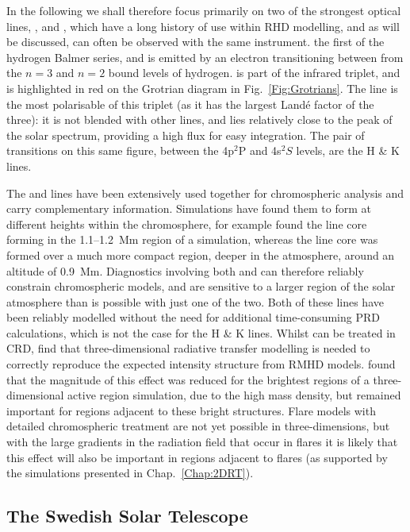 In the following we shall therefore focus primarily on two of the strongest optical lines, \Ha{}, and \CaLine{}, which have a long history of use within RHD modelling, and as will be discussed, can often be observed with the same instrument.
\Ha{} the first of the hydrogen Balmer series, and is emitted by an electron transitioning between from the $n=3$ and $n=2$ bound levels of hydrogen.
\CaLine{} is part of the \Caii{} infrared triplet, and is highlighted in red on the Grotrian diagram in Fig.~\ref{Fig:Grotrians}.
The \CaLine{} line is the most polarisable of this triplet (as it has the largest Landé factor of the three): it is not blended with other lines, and lies relatively close to the peak of the solar spectrum, providing a high flux for easy integration.
The pair of transitions on this same figure, between the 4p$^2$P and 4s$^2S$ levels, are the \Caii{} H \& K lines.

The \Ha{} and \CaLine{} lines have been extensively used together for chromospheric analysis and carry complementary information.
Simulations have found them to form at different heights within the chromosphere, for example \citet{Kuridze2015} found the \Ha{} line core forming in the 1.1--\SI{1.2}{\mega\metre} region of a \Radyn{} simulation, whereas the \CaLine{} line core was formed over a much more compact region, deeper in the atmosphere, around an altitude of \SI{0.9}{\mega\m}.
Diagnostics involving both \Ha{} and \CaLine{} can therefore reliably constrain chromospheric models, and are sensitive to a larger region of the solar atmosphere than is possible with just one of the two.
Both of these lines have been reliably modelled without the need for additional time-consuming PRD calculations, which is not the case for the \Caii{} H \& K lines.
Whilst \Ha{} can be treated in CRD, \citet{Leenaarts2012a} find that three-dimensional radiative transfer modelling is needed to correctly reproduce the expected intensity structure from RMHD models.
\citet{Bjorgen2019} found that the magnitude of this effect was reduced for the brightest regions of a three-dimensional active region simulation, due to the high mass density, but remained important for regions adjacent to these bright structures.
Flare models with detailed chromospheric treatment are not yet possible in three-dimensions, but with the large gradients in the radiation field that occur in flares it is likely that this effect will also be important in regions adjacent to flares (as supported by the simulations presented in Chap.~\ref{Chap:2DRT}).


\subsection{The Swedish Solar Telescope}\label{Sec:CRISP}


